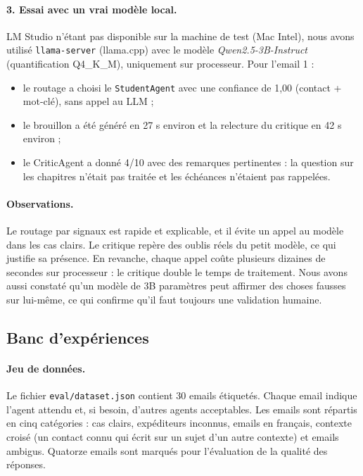 \documentclass[11pt,a4paper]{article}
\newcommand{\code}[1]{\texttt{#1}}
\begin{document}
\paragraph{3. Essai avec un vrai modèle local.}
LM Studio n'étant pas disponible sur la machine de test (Mac Intel), nous avons utilisé
\code{llama-server} (llama.cpp) avec le modèle \emph{Qwen2.5-3B-Instruct} (quantification
Q4\_K\_M), uniquement sur processeur. Pour l'email 1 :
\begin{itemize}
  \item le routage a choisi le \code{StudentAgent} avec une confiance de 1,00 (contact + mot-clé), sans appel au LLM ;
  \item le brouillon a été généré en 27 s environ et la relecture du critique en 42 s environ ;
  \item le CriticAgent a donné 4/10 avec des remarques pertinentes : la question sur les
        chapitres n'était pas traitée et les échéances n'étaient pas rappelées.
\end{itemize}

\paragraph{Observations.}
Le routage par signaux est rapide et explicable, et il évite un appel au modèle dans les
cas clairs. Le critique repère des oublis réels du petit modèle, ce qui justifie sa
présence. En revanche, chaque appel coûte plusieurs dizaines de secondes sur
processeur : le critique double le temps de traitement. Nous avons aussi constaté qu'un
modèle de 3B paramètres peut affirmer des choses fausses sur lui-même, ce qui confirme
qu'il faut toujours une validation humaine.

\subsection{Banc d'expériences}
\label{sec:banc}

\paragraph{Jeu de données.} Le fichier \code{eval/dataset.json} contient 30 emails
étiquetés. Chaque email indique l'agent attendu et, si besoin, d'autres agents
acceptables. Les emails sont répartis en cinq catégories : cas clairs, expéditeurs
inconnus, emails en français, contexte croisé (un contact connu qui écrit sur un sujet
d'un autre contexte) et emails ambigus. Quatorze emails sont marqués pour l'évaluation de
la qualité des réponses.
\end{document}
